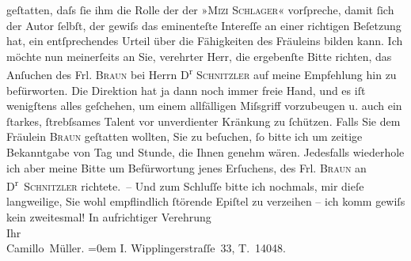 \begin{ledgroupsized}[t]{13cm}
               geſtatten, daſs ſie ihm die Rolle der der »\textsc{Mizi Schlager}« vorſpreche, damit ſich der Autor ſelbſt, der gewiſs das eminenteſte Intereſſe
               an einer richtigen Beſetzung hat, ein entſprechendes Urteil über die Fähigkeiten des
               Fräuleins bilden kann.\pend
           \pstart
           Ich möchte nun meinerſeits an Sie, verehrter Herr, die ergebenſte Bitte richten, das
                  {\pb}Anſuchen des Frl. \textsc{Braun} bei Herrn D\textsuperscript{r}{ }\textsc{Schnitzler} auf meine Empfehlung hin zu befürworten. Die
               Direktion hat ja dann noch immer freie Hand, und es iſt wenigſtens alles geſchehen,
               um einem allfälligen Miſsgriff vorzubeugen u. auch ein ſtarkes, ſtrebſsames Talent
               vor unverdienter Kränkung zu ſchützen.\pend
           \pstart
           Falls Sie dem Fräulein \textsc{Braun} geſtatten wollten, Sie zu beſuchen, ſo bitte ich um zeitige Bekanntgabe von Tag
               und Stunde, die Ihnen {\pb}genehm
               wären. Jedesfalls wiederhole ich aber meine Bitte um Befürwortung jenes Erſuchens,
               des Frl. \textsc{Braun} an D\textsuperscript{r} \textsc{Schnitzler}
               richtete. –\pend
           \pstart
           Und zum Schluſſe bitte ich nochmals, mir dieſe langweilige, Sie wohl empflindlich
               ſtörende Epiſtel zu verzeihen – ich komm gewiſs kein zweitesmal!\pend
           \pstart
           In aufrichtiger Verehrung{\\[\baselineskip]}Ihr{\\[\baselineskip]}\spacefill\mbox{Camillo Müller.}\pend
           \leftskip=0em{}\pstart
           \noindent{}I. Wipplingerstraſſe 33, T. 14048.\pend
           \pstart
           \label{T_L01796_1v}\label{T_L01796_1h}\pend
           
         
         \endnumbering{}\end{ledgroupsized}  \newcommand{\dateiname}{L01796}\newcommand{\titel}{Hugo und Gerty von Hofmannsthal an Arthur Schnitzler, 31. 10. 1908}\newcommand{\editorInnen}{Martin Anton Müller und Gerd-Hermann Susen}
      